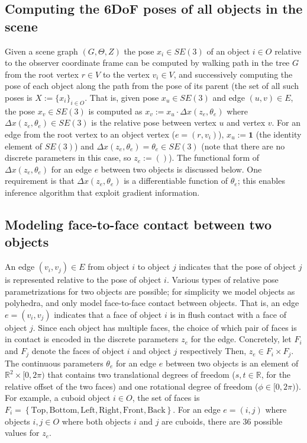 \subsection{Computing the 6DoF poses of all objects in the scene} \label{6dofCalculation}
Given a scene graph $(G, \Theta, Z)$ the pose $x_i \in SE(3)$ of an object $i \in O$ relative to the observer coordinate frame can be computed by walking path in the tree $G$ from the root vertex $r \in V$ to the vertex $v_i \in V$, and successively computing the pose of each object along the path from the pose of its parent (the set of all such poses is $X := \{x_i\}_{i \in O}$.
That is, given pose $x_u \in SE(3)$ and edge $(u, v) \in E$, the pose $x_v \in SE(3)$ is computed as $x_v := x_u \cdot \Delta x(z_e, \theta_e)$ where $\Delta x(z_e, \theta_e) \in SE(3)$ is the relative pose between vertex $u$ and vertex $v$.
For an edge from the root vertex to an object vertex ($e = (r, v_i)$), $x_u := \mathbf{1}$ (the identity element of $SE(3)$) and $\Delta x(z_e, \theta_e) = \theta_e \in SE(3)$ (note that there are no discrete parameters in this case, so $z_e := ()$).
The functional form of $\Delta x(z_e, \theta_e)$ for an edge $e$ between two objects is discussed below.
One requirement is that $\Delta x(z_e, \theta_e)$ is a differentiable function of $\theta_e$; this enables inference algorithm that exploit gradient information.

\subsection{Modeling face-to-face contact between two objects}
An edge $(v_i, v_j) \in E$ from object $i$ to object $j$ indicates that the pose of object $j$ is represented relative to the pose of object $i$.
Various types of relative pose parametrizations for two objects are possible; for simplicity we model objects as polyhedra, and only model face-to-face contact between objects.
That is, an edge $e = (v_i, v_j)$ indicates that a face of object $i$ is in flush contact with a face of object $j$.
Since each object has multiple faces, the choice of which pair of faces is in contact is encoded in the discrete parameters $z_e$ for the edge.
Concretely, let $F_i$ and $F_j$ denote the faces of object $i$ and object $j$ respectively
Then, $z_e \in F_i \times F_j$.
The continuous parameters $\theta_e$ for an edge $e$ between two objects is an element of $\mathbb{R}^2 \times [0, 2 \pi)$ that contains two translational degrees of freedom ($s, t \in \mathbb{R}$, for the relative offset of the two faces) and one rotational degree of freedom ($\phi \in [0, 2 \pi)$).
For example, a cuboid object $i \in O$, the set of faces is $F_i = \left\{\mathrm{Top, Bottom, Left, Right, Front, Back}\right\}$.
For an edge $e = (i, j)$ where objects $i, j \in O$ where both objects $i$ and $j$ are cuboids, there are 36 possible values for $z_e$.

